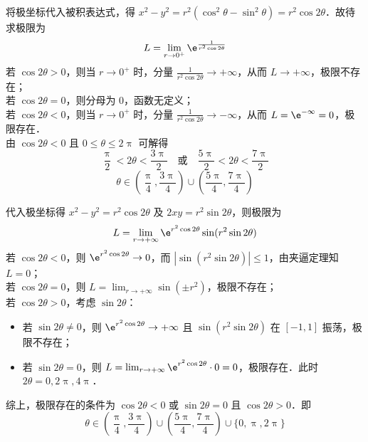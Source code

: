\begin{solution}

    将极坐标代入被积表达式，得 $x^2 - y^2 = r^2(\cos^2 \theta - \sin^2 \theta) = r^2 \cos 2\theta$．故待求极限为
    \begin{equation}
        L = \lim_{r \to 0^+} \e^{\frac{1}{r^2 \cos 2\theta}}
    \end{equation}
    若 $\cos 2\theta > 0$，则当 $r \to 0^+$ 时，分量 $\frac{1}{r^2 \cos 2\theta} \to +\infty$，从而 $L \to +\infty$，极限不存在；\\
    若 $\cos 2\theta = 0$，则分母为 $0$，函数无定义；\\
    若 $\cos 2\theta < 0$，则当 $r \to 0^+$ 时，分量 $\frac{1}{r^2 \cos 2\theta} \to -\infty$，从而 $L = \e^{-\infty} = 0$，极限存在．\\
    由 $\cos 2\theta < 0$ 且 $0 \le \theta \le 2\uppi$ 可解得
    \begin{equation}
        \frac{\uppi}{2} < 2\theta < \frac{3\uppi}{2} \quad \text{或} \quad \frac{5\uppi}{2} < 2\theta < \frac{7\uppi}{2}
    \end{equation}
    \begin{equation}
        \boxed{\theta \in \left( \frac{\uppi}{4}, \frac{3\uppi}{4} \right) \cup \left( \frac{5\uppi}{4}, \frac{7\uppi}{4} \right)}
    \end{equation}


    代入极坐标得 $x^2 - y^2 = r^2 \cos 2\theta$ 及 $2xy = r^2 \sin 2\theta$，则极限为
    \begin{equation}
        L = \lim_{r \to +\infty} \e^{r^2 \cos 2\theta} \sin(r^2 \sin 2\theta)
    \end{equation}
    若 $\cos 2\theta < 0$，则 $\e^{r^2 \cos 2\theta} \to 0$，而 $|\sin(r^2 \sin 2\theta)| \le 1$，由夹逼定理知 $L = 0$；\\
    若 $\cos 2\theta = 0$，则 $L = \lim_{r \to +\infty} \sin(\pm r^2)$，极限不存在；\\
    若 $\cos 2\theta > 0$，考虑 $\sin 2\theta$：
    \begin{itemize}
        \item 若 $\sin 2\theta \neq 0$，则 $\e^{r^2 \cos 2\theta} \to +\infty$ 且 $\sin(r^2 \sin 2\theta)$ 在 $[-1, 1]$ 振荡，极限不存在；
        \item 若 $\sin 2\theta = 0$，则 $L = \lim_{r \to +\infty} \e^{r^2 \cos 2\theta} \cdot 0 = 0$，极限存在．此时 $2\theta = 0, 2\uppi, 4\uppi$．
    \end{itemize}
    综上，极限存在的条件为 $\cos 2\theta < 0$ 或 $\sin 2\theta = 0$ 且 $\cos 2\theta > 0$．即
    \begin{equation}
        \boxed{\theta \in \left( \frac{\uppi}{4}, \frac{3\uppi}{4} \right) \cup \left( \frac{5\uppi}{4}, \frac{7\uppi}{4} \right) \cup \{0, \uppi, 2\uppi\}}
    \end{equation}
\end{solution}


